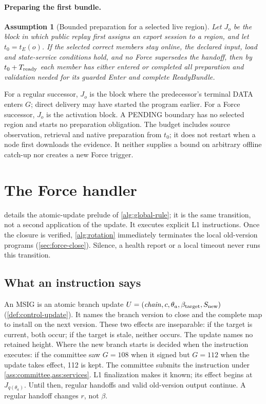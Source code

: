 \documentclass[11pt,a4paper]{article}
\newtheorem{assumption}[assumption]{Assumption}
\begin{document}
\paragraph{Preparing the first bundle.}
\begin{assumption}[Bounded preparation for a selected live region]
\label{ass:ready-service}
Let $J_o$ be the block in which public replay first assigns an export
session to a region, and let $t_0=t_E(o)$. If the selected correct
members stay online, the declared input, load and state-service
conditions hold, and no Force supersedes the handoff, then by
$t_0+T_{\rm ready}$ each member has either entered or completed all
preparation and validation needed for its guarded Enter and complete
ReadyBundle.
\end{assumption}
For a regular successor, $J_o$ is the block where the predecessor's
terminal DATA enters $G$; direct delivery may have started the program
earlier. For a Force successor, $J_o$ is the activation block.
A PENDING boundary has no selected region and starts no preparation
obligation. The budget includes source observation, retrieval and native
preparation from $t_0$; it does not restart when a node first downloads
the evidence. It neither supplies a bound on arbitrary offline catch-up
nor creates a new Force trigger.

\section{The Force handler}
\label{sec:force}
 details the atomic-update prelude of
\cref{alg:global-rule}; it is the same transition, not a second
application of the update. It executes explicit L1 instructions.
Once the closure is verified, \cref{alg:rotation} immediately terminates
the local old-version programs (\cref{sec:force-close}). Silence, a
health report or a local timeout never runs this transition.

\subsection{What an instruction says}
\label{sec:force-stages}
An MSIG is an atomic branch update
$U=(\mathit{chain},c,\theta_a,\beta_{\rm target},S_{\rm new})$
(\cref{def:control-update}). It names the branch version to close and the
complete map to install on the next version. These two effects are
inseparable: if the target is current, both occur; if the target is
stale, neither occurs. The update names no retained height. Where the new
branch starts is decided when the instruction executes: if the committee
saw $G=108$ when it signed but $G=112$ when the update takes effect, 112
is kept. The committee submits the instruction under
\cref{ass:committee,ass:services}. L1 finalization makes it known; its
effect begins at $J_{q(\theta_a)}$. Until then, regular handoffs and
valid old-version output continue. A regular handoff changes $r$, not
$\beta$.
\end{document}
